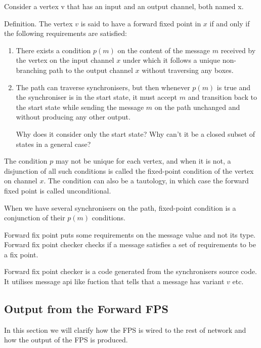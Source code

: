 Consider a vertex v that has an input and an output channel, both named x.

Definition. The vertex $v$ is said to have a forward fixed point in $x$ if and only if the following requirements are satisfied:

\begin{enumerate}
\item There exists a condition $p(m)$ on the content of the message $m$ received by the vertex on the input channel $x$ under which it follows a unique non-branching path to the output channel $x$ without traversing any boxes.

\item The path can traverse synchronisers, but then whenever $p(m)$ is true and the synchroniser is in the start state, it must accept $m$ and transition back to the start state while sending the message $m$ on the path unchanged and without producing any other output.

Why does it consider only the start state? Why can't it be a closed subset of states in a general case?
\end{enumerate}


The condition $p$ may not be unique for each vertex, and when it is not, a disjunction of all such conditions is called the fixed-point condition of the vertex on channel $x$. The condition can also be a tautology, in which case the forward fixed point is called unconditional.


When we have several synchronisers on the path, fixed-point condition is a conjunction of their $p(m)$ conditions.




Forward fix point puts some requirements on the message value and not its type.
Forward fix point checker checks if a message satisfies a set of requirements to be a fix point.

Forward fix point checker is a code generated from the synchronisers source code. It utilises message api like fuction that tells that a message has variant $v$ etc.



    \subsection{Output from the Forward FPS}
In this section we will clarify how the FPS is wired to the rest of network and how the output of the FPS is produced.

